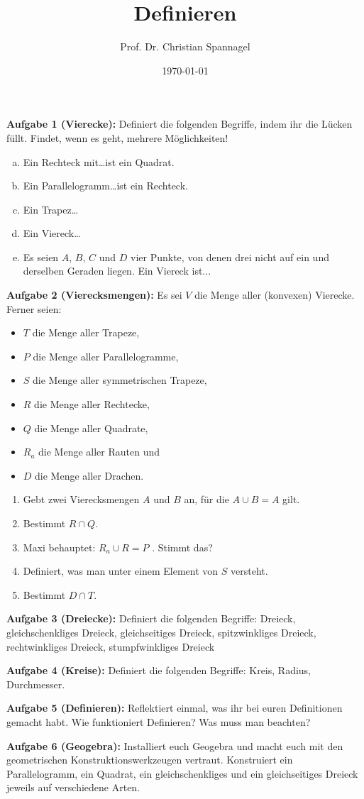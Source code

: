 \documentclass{../cssheet}
\title{Definieren}
\author{Prof. Dr. Christian Spannagel}
\date{\today}
\begin{document}
\printtitle

\textbf{Aufgabe 1 (Vierecke):}  Definiert die folgenden Begriffe, indem ihr die Lücken füllt. Findet, wenn es geht, mehrere Möglichkeiten!
\begin{enumerate}[a)]
\item Ein Rechteck mit\ldots ist ein Quadrat.
\item Ein Parallelogramm\ldots ist ein Rechteck.
\item Ein Trapez\ldots
\item Ein Viereck\ldots
\item Es seien $A$, $B$, $C$ und $D$ vier Punkte, von denen drei nicht auf ein und derselben Geraden liegen. Ein Viereck ist...
\end{enumerate}

\textbf{Aufgabe 2 (Vierecksmengen):} Es sei $V$ die Menge aller (konvexen) Vierecke. Ferner seien: 
\begin{itemize}
\item $T$ die Menge aller Trapeze,
\item $P$ die Menge aller Parallelogramme,
\item $S$ die Menge aller symmetrischen Trapeze,
\item $R$ die Menge aller Rechtecke,
\item $Q$ die Menge aller Quadrate,
\item $R_a$ die Menge aller Rauten und
\item $D$ die Menge aller Drachen.
\end{itemize}
\begin{enumerate}
\item Gebt zwei Vierecksmengen $A$ und $B$ an, für die $A\cup B = A$ gilt.
\item Bestimmt $R \cap Q$.
\item Maxi behauptet: $R_a \cup R = P$ . Stimmt das?
\item Definiert, was man unter einem Element von $S$ versteht.
\item Bestimmt $D\cap T$.
\end{enumerate}

\textbf{Aufgabe 3 (Dreiecke):}  Definiert die folgenden Begriffe: Dreieck, gleichschenkliges Dreieck, gleichseitiges Dreieck, spitzwinkliges Dreieck, rechtwinkliges Dreieck, stumpfwinkliges Dreieck

\textbf{Aufgabe 4 (Kreise):} Definiert die folgenden Begriffe: Kreis, Radius, Durchmesser.

\textbf{Aufgabe 5 (Definieren):}  Reflektiert einmal, was ihr bei euren Definitionen gemacht habt. Wie funktioniert Definieren? Was muss man beachten?

\textbf{Aufgabe 6 (Geogebra):} Installiert euch Geogebra und macht euch mit den geometrischen Konstruktionswerkzeugen vertraut. Konstruiert ein Parallelogramm, ein Quadrat, ein gleichschenkliges und ein gleichseitiges Dreieck jeweils auf verschiedene Arten.

\newpage
\printlicense

\printsocials

\end{document}
